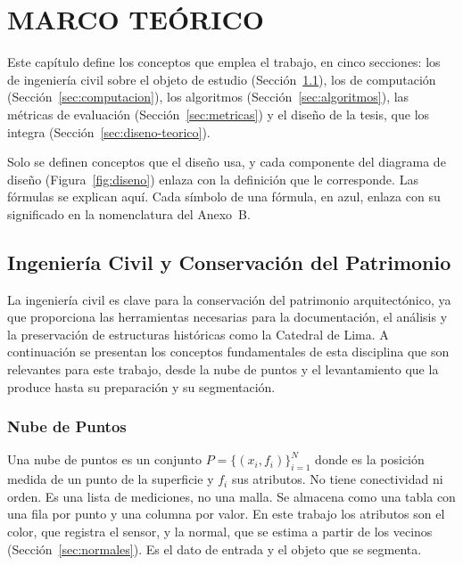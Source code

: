 \chapter{MARCO TEÓRICO}
\label{cap:teorico}

Este capítulo define los conceptos que emplea el trabajo, en cinco secciones: los
de ingeniería civil sobre el objeto de estudio (Sección~\ref{sec:civil}), los de
computación (Sección~\ref{sec:computacion}), los algoritmos
(Sección~\ref{sec:algoritmos}), las métricas de evaluación
(Sección~\ref{sec:metricas}) y el diseño de la tesis, que los integra
(Sección~\ref{sec:diseno-teorico}).

Solo se definen conceptos que el diseño usa, y cada componente del diagrama de
diseño (Figura~\ref{fig:diseno}) enlaza con la definición que le corresponde. Las
fórmulas se explican aquí. Cada símbolo de una fórmula, en azul, enlaza con su
significado en la nomenclatura del Anexo~B.

\section{Ingeniería Civil y Conservación del Patrimonio}
\label{sec:civil}

La ingeniería civil es clave para la conservación del patrimonio
arquitectónico, ya que proporciona las herramientas necesarias para la
documentación, el análisis y la preservación de estructuras históricas como la
Catedral de Lima. A continuación se presentan los conceptos fundamentales de
esta disciplina que son relevantes para este trabajo, desde la nube de puntos y
el levantamiento que la produce hasta su preparación y su segmentación.

\subsection{Nube de Puntos}
\label{sec:nube}

Una nube de puntos es un conjunto $P=\{(x_i,f_i)\}_{i=1}^{N}$ donde
 es la posición medida de un punto de la superficie y $f_i$
sus atributos. No tiene conectividad ni orden. Es una lista de mediciones, no
una malla.
Se almacena como una tabla con una fila por punto y una
columna por valor. En este trabajo los atributos son el color, que registra el
sensor, y la normal, que se estima a partir de los vecinos
(Sección~\ref{sec:normales}). Es el dato de entrada y el objeto que se segmenta.

